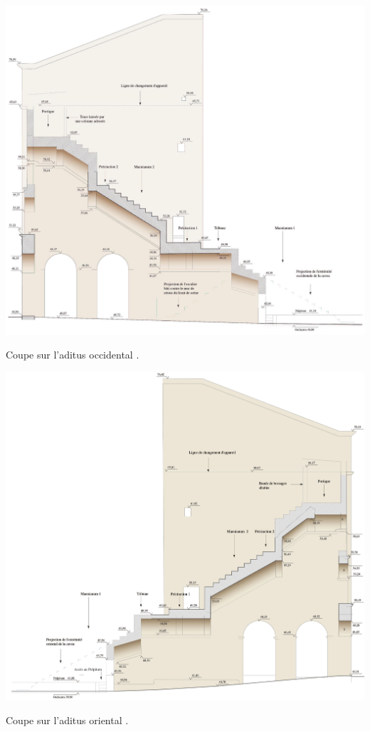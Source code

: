 \newpage
\begin{figureth}
		\includegraphics[width=\linewidth]{images/aditusOccidental}
		\caption[Coupe sur l'\gls{aditus} occidental]{Coupe sur l'\gls{aditus} occidental \footnotemark.}
		\label{aditusOccidental}	
\end{figureth}

\newpage
\begin{figureth}
		\includegraphics[width=\linewidth]{images/aditusOriental}
		\caption[Coupe sur l'\gls{aditus} oriental.]{Coupe sur l'\gls{aditus} oriental \footnotemark.}
		\label{aditusOriental}
\end{figureth}
\newpage

